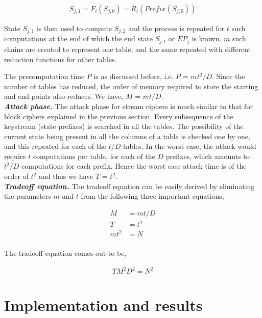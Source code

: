 \begin{align*}
S_{j,1} = F_i(S_{j,0}) = R_i(Prefix(S_{j,0}))
\end{align*}  

State $S_{j,1}$ is then used to compute $S_{j,2}$ and the process is repeated for $t$ such computations at the end of which the end state $S_{j,t}$ or $EP_j$ is known. $m$ such chains are created to represent one table, and the same repeated with different reduction functions for other tables. 

The precomputation time $P$ is as discussed before, i.e. $P$ = $mt^2/D$. Since the number of tables has reduced, the order of memory required to store the starting and end points also reduces. We have, $M$ = $mt/D$.\\

\noindent \textit{\textbf{Attack phase.}} The attack phase for stream ciphers is much similar to that for block ciphers explained in the previous section. Every subsequence of the keystream (state prefixes) is searched in all the tables. The possibility of the current state being present in all the columns of a table is checked one by one, and this repeated for each of the $t/D$ tables. In the worst case, the attack would require $t$ computations per table, for each of the $D$ prefixes, which amounts to $t^2/D$ computations for each prefix. Hence the worst case attack time is of the order of $t^2$ and thus we have $T$ = $t^2$.\\

\noindent \textit{\textbf{Tradeoff equation.}} The tradeoff equation can be easily derived by eliminating the parameters $m$ and $t$ from the following three important equations,

\begin{align*}
M &= mt/D\\
T &= t^2\\
mt^2 &= N\\
\end{align*}

The tradeoff equation comes out to be,

\begin{align}
\label{eq:tmdto-hellman-stream} TM^2D^2 = N^2
\end{align}

\section{Implementation and results}


	

